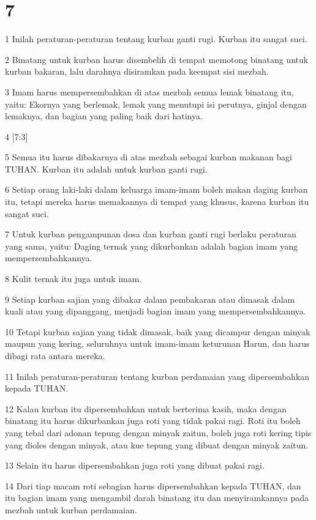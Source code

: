 \chapter{7}

\par 1 Inilah peraturan-peraturan tentang kurban ganti rugi. Kurban itu sangat suci.
\par 2 Binatang untuk kurban harus disembelih di tempat memotong binatang untuk kurban bakaran, lalu darahnya disiramkan pada keempat sisi mezbah.
\par 3 Imam harus mempersembahkan di atas mezbah semua lemak binatang itu, yaitu: Ekornya yang berlemak, lemak yang menutupi isi perutnya, ginjal dengan lemaknya, dan bagian yang paling baik dari hatinya.
\par 4 [7:3]
\par 5 Semua itu harus dibakarnya di atas mezbah sebagai kurban makanan bagi TUHAN. Kurban itu adalah untuk kurban ganti rugi.
\par 6 Setiap orang laki-laki dalam keluarga imam-imam boleh makan daging kurban itu, tetapi mereka harus memakannya di tempat yang khusus, karena kurban itu sangat suci.
\par 7 Untuk kurban pengampunan dosa dan kurban ganti rugi berlaku peraturan yang sama, yaitu: Daging ternak yang dikurbankan adalah bagian imam yang mempersembahkannya.
\par 8 Kulit ternak itu juga untuk imam.
\par 9 Setiap kurban sajian yang dibakar dalam pembakaran atau dimasak dalam kuali atau yang dipanggang, menjadi bagian imam yang mempersembahkannya.
\par 10 Tetapi kurban sajian yang tidak dimasak, baik yang dicampur dengan minyak maupun yang kering, seluruhnya untuk imam-imam keturunan Harun, dan harus dibagi rata antara mereka.
\par 11 Inilah peraturan-peraturan tentang kurban perdamaian yang dipersembahkan kepada TUHAN.
\par 12 Kalau kurban itu dipersembahkan untuk berterima kasih, maka dengan binatang itu harus dikurbankan juga roti yang tidak pakai ragi. Roti itu boleh yang tebal dari adonan tepung dengan minyak zaitun, boleh juga roti kering tipis yang dioles dengan minyak, atau kue tepung yang dibuat dengan minyak zaitun.
\par 13 Selain itu harus dipersembahkan juga roti yang dibuat pakai ragi.
\par 14 Dari tiap macam roti sebagian harus dipersembahkan kepada TUHAN, dan itu bagian imam yang mengambil darah binatang itu dan menyiramkannya pada mezbah untuk kurban perdamaian.
